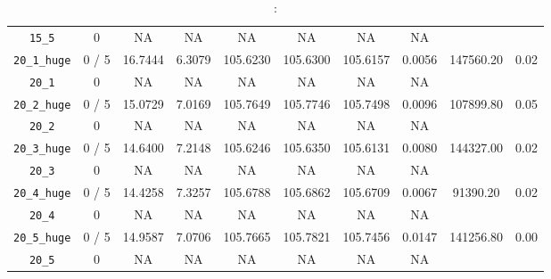 \documentclass{scrartcl}
\begin{document}
\begin{table}[h!]
\begin{center}
\begin{tabular}{| c | c | c | c | c | c | c | c | c | c |}
\verb|15_5| & 0 & NA & NA & NA & NA & NA & NA & \\ 
\verb|20_1_huge| & 0 / 5 & 16.7444 & 6.3079 & 105.6230 & 105.6300 & 105.6157 & 0.0056 & 147560.20 & 0.02\\ 
\verb|20_1| & 0 & NA & NA & NA & NA & NA & NA & \\ 
\verb|20_2_huge| & 0 / 5 & 15.0729 & 7.0169 & 105.7649 & 105.7746 & 105.7498 & 0.0096 & 107899.80 & 0.05\\ 
\verb|20_2| & 0 & NA & NA & NA & NA & NA & NA & \\ 
\verb|20_3_huge| & 0 / 5 & 14.6400 & 7.2148 & 105.6246 & 105.6350 & 105.6131 & 0.0080 & 144327.00 & 0.02\\ 
\verb|20_3| & 0 & NA & NA & NA & NA & NA & NA & \\ 
\verb|20_4_huge| & 0 / 5 & 14.4258 & 7.3257 & 105.6788 & 105.6862 & 105.6709 & 0.0067 & 91390.20 & 0.02\\ 
\verb|20_4| & 0 & NA & NA & NA & NA & NA & NA & \\ 
\verb|20_5_huge| & 0 / 5 & 14.9587 & 7.0706 & 105.7665 & 105.7821 & 105.7456 & 0.0147 & 141256.80 & 0.00\\ 
\verb|20_5| & 0 & NA & NA & NA & NA & NA & NA & \\ 
\hline
\end{tabular}
\caption{:}
\label{table:}
\end{center}
\end{table}
\end{document}
